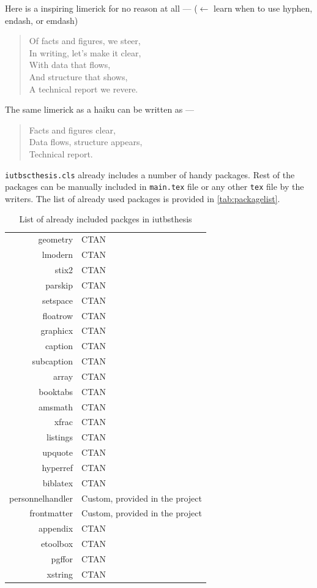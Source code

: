 \documentclass{iutbscthesis}
\begin{document}
Here is a inspiring limerick for no reason at all --- ($\leftarrow$ learn when to use hyphen, endash, or emdash)

\begin{quote}
    Of facts and figures, we steer, \\
    In writing, let's make it clear, \\
    With data that flows, \\
    And structure that shows, \\
    A technical report we revere.
\end{quote}

The same limerick as a haiku can be written as ---

\begin{quote}
    Facts and figures clear, \\
    Data flows, structure appears, \\
    Technical report.
\end{quote}

\verb|iutbscthesis.cls| already includes a number of handy packages. Rest of the packages can be manually included in \verb|main.tex| file or any other \verb|tex| file by the writers. The list of already used packages is provided in \autoref{tab:packagelist}.

\begin{table}[H]
    \centering
    \begin{tabular}{>{\ttfamily}r l}
        geometry & CTAN \\
        lmodern & CTAN \\
        stix2 & CTAN \\
        parskip & CTAN \\
        setspace & CTAN \\
        floatrow & CTAN \\
        graphicx & CTAN \\
        caption & CTAN \\
        subcaption & CTAN \\
        array & CTAN \\
        booktabs & CTAN \\
        amsmath & CTAN \\
        xfrac & CTAN \\
        listings & CTAN \\
        upquote & CTAN \\
        hyperref & CTAN \\
        biblatex & CTAN \\
        personnelhandler & Custom, provided in the project \\
        frontmatter & Custom, provided in the project \\
        appendix & CTAN \\
        etoolbox & CTAN \\
        pgffor & CTAN \\
        xstring & CTAN \\
    \end{tabular}
    \caption{List of already included packges in iutbsthesis}
    \label{tab:packagelist}
\end{table}
\end{document}
